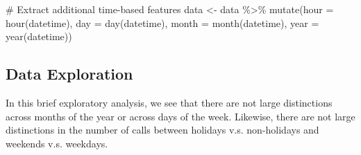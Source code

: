 \documentclass[
  letterpaper,
  DIV=11,
  numbers=noendperiod]{scrartcl}
\newenvironment{Shaded}{\begin{snugshade}}{\end{snugshade}}
\newcommand{\AttributeTok}[1]{\textcolor[rgb]{0.40,0.45,0.13}{#1}}
\newcommand{\CommentTok}[1]{\textcolor[rgb]{0.37,0.37,0.37}{#1}}
\newcommand{\FunctionTok}[1]{\textcolor[rgb]{0.28,0.35,0.67}{#1}}
\newcommand{\NormalTok}[1]{\textcolor[rgb]{0.00,0.23,0.31}{#1}}
\newcommand{\OtherTok}[1]{\textcolor[rgb]{0.00,0.23,0.31}{#1}}
\newcommand{\SpecialCharTok}[1]{\textcolor[rgb]{0.37,0.37,0.37}{#1}}
\begin{document}
\begin{Shaded}
\begin{Highlighting}[]
\CommentTok{\# Extract additional time{-}based features}
\NormalTok{data }\OtherTok{\textless{}{-}}\NormalTok{ data }\SpecialCharTok{\%\textgreater{}\%}
  \FunctionTok{mutate}\NormalTok{(}\AttributeTok{hour =} \FunctionTok{hour}\NormalTok{(datetime),}
         \AttributeTok{day =} \FunctionTok{day}\NormalTok{(datetime),}
         \AttributeTok{month =} \FunctionTok{month}\NormalTok{(datetime),}
         \AttributeTok{year =} \FunctionTok{year}\NormalTok{(datetime))}
\end{Highlighting}
\end{Shaded}

\hypertarget{data-exploration}{%
\subsection{Data Exploration}\label{data-exploration}}

In this brief exploratory analysis, we see that there are not large
distinctions across months of the year or across days of the week.
Likewise, there are not large distinctions in the number of calls
between holidays v.s. non-holidays and weekends v.s. weekdays.
\end{document}
